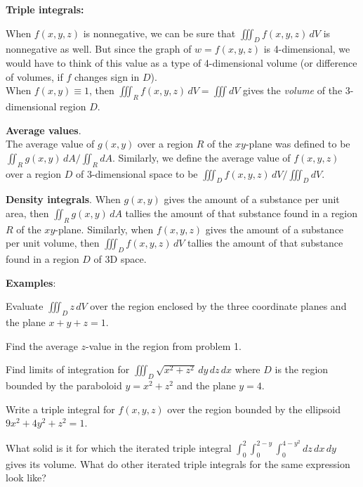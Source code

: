 \documentclass[12pt,fleqn]{article}
\def\egs#1{{\bf Examples}: #1}
\begin{document}
	{\bf Triple integrals:}
	\bq
	\begin{minipage}[t]{5.5in}
	When $f(x,y,z)$ is nonnegative, we can be sure that
	$\iiint_D f(x,y,z)\,dV$ is nonnegative as well.  But
	since the graph of $w = f(x,y,z)$ is 4-dimensional,
	we would have to think of this value as a type of
	4-dimensional volume (or difference of volumes, if
	$f$ changes sign in $D$).\\[10pt]
	When $f(x,y) \equiv 1$, then $\iiint_R f(x,y,z)\,dV
	= \iiint dV$ gives the {\em volume} of the 3-dimensional
	region $D$.
	\end{minipage}
	\eq

  \item {\bf Average values}.\\
	The average value of $g(x,y)$ over a region $R$ of the
	$xy$-plane was defined to be
	$\iint_R g(x,y)\,dA/\iint_R dA$.
	Similarly, we define the average value of
	$f(x,y,z)$ over a region $D$ of 3-dimensional space
	to be $\iiint_D f(x,y,z)\,dV/\iiint_D dV$.

  \item {\bf Density integrals}.
	When $g(x,y)$ gives the amount of a substance per unit
	area, then $\iint_R g(x,y)\,dA$ tallies the amount of
	that substance found in a region $R$ of the $xy$-plane.
	Similarly, when $f(x,y,z)$ gives the amount of a substance
	per unit volume, then $\iiint_D f(x,y,z)\,dV$ tallies the
	amount of that substance found in a region $D$ of 3D space.
  \ee
\ee


\vspace{0.2in}
\ni
\egs{}
\be
\item
  Evaluate $\iiint_D z\,dV$ over the region enclosed by the
  three coordinate planes and the plane $x + y + z = 1$.
\item
  Find the average $z$-value in the region from problem 1.
\item
  Find limits of integration for $\iiint_D \sqrt{x^2 + z^2}
  \,dy \,dz \,dx$ where $D$ is the region bounded by the paraboloid
  $y = x^2 + z^2$ and the plane $y = 4$.
\item
  Write a triple integral for $f(x,y,z)$ over the region bounded
  by the ellipsoid $9x^2 + 4y^2 + z^2 = 1$.
\item
  What solid is it for which the iterated triple integral
  $\int_0^2 \int_0^{2-y} \int_0^{4-y^2} dz \,dx \,dy$
  gives its volume.  What do other iterated triple
  integrals for the same expression look like?
\ee
\end{document}
